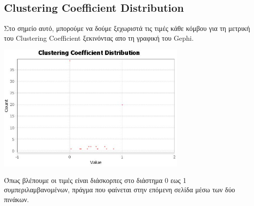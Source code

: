 \documentclass[12pt]{article}
\begin{document}
	\subsection{Clustering Coefficient Distribution}
	Στο σημείο αυτό, μπορούμε να δούμε ξεχωριστά τις τιμές κάθε κόμβου για τη μετρική του Clustering Coefficient ξεκινόντας απο τη γραφική του Gephi.
	\begin{center}
		\includegraphics[width=0.7\textwidth]{photos-files/section8/distribution.JPG}
	\end{center}
	\par
	Όπως βλέπουμε οι τιμές είναι διάσκορπες στο διάστημα 0 εως 1 συμπεριλαμβανομένων, πράγμα που φαίνεται στην επόμενη σελίδα μέσω των δύο πινάκων.
\end{document}
